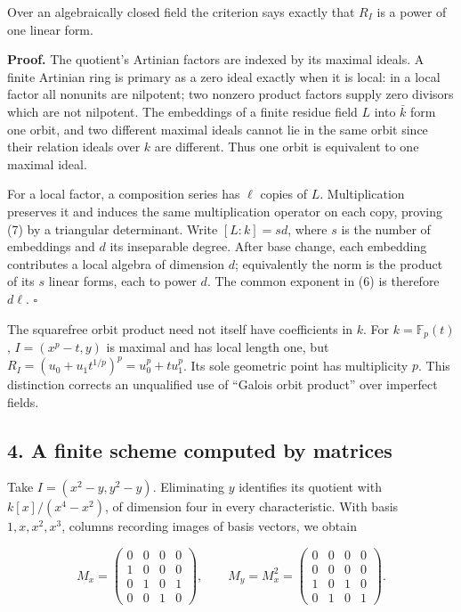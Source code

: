 \documentclass[
]{article}
\begin{document}
Over an algebraically closed field the criterion says exactly that
\(R_I\) is a power of one linear form.

\textbf{Proof.} The quotient's Artinian factors are indexed by its
maximal ideals. A finite Artinian ring is primary as a zero ideal
exactly when it is local: in a local factor all nonunits are nilpotent;
two nonzero product factors supply zero divisors which are not
nilpotent. The embeddings of a finite residue field \(L\) into
\(\bar k\) form one orbit, and two different maximal ideals cannot lie
in the same orbit since their relation ideals over \(k\) are different.
Thus one orbit is equivalent to one maximal ideal.

For a local factor, a composition series has \(\ell\) copies of \(L\).
Multiplication preserves it and induces the same multiplication operator
on each copy, proving (7) by a triangular determinant. Write
\([L:k]=sd\), where \(s\) is the number of embeddings and \(d\) its
inseparable degree. After base change, each embedding contributes a
local algebra of dimension \(d\); equivalently the norm is the product
of its \(s\) linear forms, each to power \(d\). The common exponent in
(6) is therefore \(d\ell\). \(\square\)

The squarefree orbit product need not itself have coefficients in \(k\).
For \(k=\mathbb F_p(t)\), \(I=(x^p-t,y)\) is maximal and has local
length one, but \(R_I=(u_0+u_1t^{1/p})^p=u_0^p+t u_1^p\). Its sole
geometric point has multiplicity \(p\). This distinction corrects an
unqualified use of ``Galois orbit product'' over imperfect fields.

\subsection{4. A finite scheme computed by
matrices}\label{a-finite-scheme-computed-by-matrices}

Take \(I=(x^2-y,y^2-y)\). Eliminating \(y\) identifies its quotient with
\(k[x]/(x^4-x^2)\), of dimension four in every characteristic. With
basis \(1,x,x^2,x^3\), columns recording images of basis vectors, we
obtain

\[
M_x=\begin{pmatrix}0&0&0&0\\1&0&0&0\\0&1&0&1\\0&0&1&0\end{pmatrix},
\qquad
M_y=M_x^2=\begin{pmatrix}0&0&0&0\\0&0&0&0\\1&0&1&0\\0&1&0&1\end{pmatrix}.
\]
\end{document}
